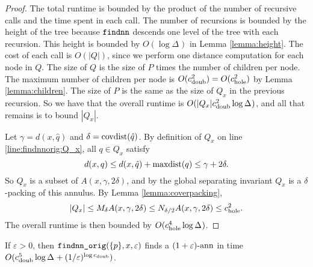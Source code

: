 \documentclass[../main.tex]{subfiles}
\newcommand{\dist}[2]{\distf({#1},{#2})}
\newcommand{\distf}{d}
\newcommand{\aspect}[1]{\Delta_{#1}}
\newcommand{\cdoub}{c_\textnormal{doub}}
\newcommand{\chole}{c_\textnormal{hole}}
\newcommand{\mkfunction}[1]{\ifmmode{\textnormal{{#1}}}}
\newcommand{\covdist}[1]    {\mkfunction{covdist}({#1})}
\newcommand{\maxdist}[1]    {\mkfunction{maxdist}({#1})}
\newcommand{\mkprocedure}[1]{\textnormal{\ttfamily {#1}}}
\newcommand{\findnn}{\mkprocedure{findnn}}
\newcommand{\findnnorig}{\mkprocedure{findnn\_orig}}
\begin{document}
\begin{proof}
    The total runtime is bounded by the product of the number of recursive calls and the time spent in each call.
    The number of recursions is bounded by the height of the tree because $\findnn$ descends one level of the tree with each recursion.
    This height is bounded by $O(\log\aspect{})$ in Lemma \ref{lemma:height}.
    The cost of each call is $O(|Q|)$,
    since we perform one distance computation for each node in $Q$.
    The size of $Q$ is the size of $P$ times the number of children per node.
    The maximum number of children per node is $O(\cdoub^2) = O(\chole^2)$ by Lemma \ref{lemma:children}.
    The size of $P$ is the same as the size of $Q_x$ in the previous recursion.
    So we have that the overall runtime is $O(|Q_x|\cdoub^2\log\aspect{})$,
    and all that remains is to bound $|Q_x|$.

    Let $\gamma=\dist{x}{\hat q}$ and $\delta=\covdist{\hat q}$.
    By definition of $Q_x$ on line \ref{line:findnnorig:Q_x}, all $q\in Q_x$ satisfy
    \begin{equation}
        \dist{x}{q} \le \dist{x}{\hat q} + \maxdist{q} \le \gamma+2\delta
        .
    \end{equation}
    So $Q_x$ is a subset of $A(x,\gamma,2\delta)$,
    and by the global separating invariant $Q_x$ is a $\delta$-packing of this annulus.
    By Lemma \ref{lemma:coverpacking},
    \begin{equation}
        |Q_x| 
        \le M_\delta A(x,\gamma,2\delta)     
        \le N_{\delta/2} A(x,\gamma,2\delta)
        \le \chole^2
        .
    \end{equation}
    The overall runtime is then bounded by $O(\chole^4\log\aspect{})$.
\end{proof}

\begin{theorem}
    If $\varepsilon > 0$,
    then $\findnnorig(\{p\},x,\varepsilon)$ finds a $(1+\varepsilon)\text{-ann}$ in time $O(\cdoub^5\log\aspect{} + (1/\varepsilon)^{\log \cdoub})$.
\end{theorem}
\end{document}
